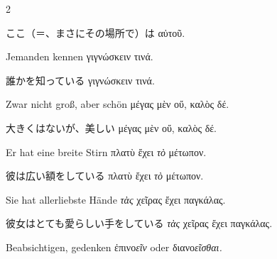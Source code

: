 \begin{paracol}{2}
\begin{enumerate}[leftmargin=0pt,rightmargin=0pt,listparindent =1cm,labelindent=1cm,labelsep=1ex,labelwidth={*},itemindent={*},align=left]
\begin{continuousitemline}
\begin{japanese}
ここ（＝、まさにその場所で）は \textgreek[variant=ancient]{αὐτοῦ.}
\end{japanese}
\switchcolumn*
\end{continuousitemline}

\begin{german}
\item Jemanden kennen \textgreek[variant=ancient]{γιγνώσκειν τινά.}
\end{german}
\switchcolumn

\begin{japanese}
誰かを知っている \textgreek[variant=ancient]{γιγνώσκειν τινά.}
\end{japanese}
\switchcolumn*

\begin{german}
\item Zwar nicht groß, aber schön \textgreek[variant=ancient]{μέγας μὲν
οὔ, καλὸς δέ.}
\end{german}
\switchcolumn

\begin{japanese}
大きくはないが、美しい \textgreek[variant=ancient]{μέγας μὲν
οὔ, καλὸς δέ.}
\end{japanese}
\switchcolumn*

\begin{german}
\item Er hat eine breite Stirn \textgreek[variant=ancient]{πλατὺ ἔχει \emph{τὸ}
μέτωπον.}
\end{german}
\switchcolumn

\begin{japanese}
彼は広い額をしている \textgreek[variant=ancient]{πλατὺ ἔχει \emph{τὸ}
μέτωπον.}
\end{japanese}
\switchcolumn*

\begin{german}
Sie hat allerliebste Hände \textgreek[variant=ancient]{\emph{τὰς}
χεῖρας ἔχει παγκάλας.}
\end{german}
\switchcolumn

\begin{japanese}
彼女はとても愛らしい手をしている \textgreek[variant=ancient]{\emph{τὰς}
χεῖρας ἔχει παγκάλας.}
\end{japanese}
\switchcolumn*

\begin{german}
\item Beabsichtigen, gedenken \textgreek[variant=ancient]{ἐπινο\emph{εῖν}}
oder \textgreek[variant=ancient]{διανο\emph{εῖσθαι.}}
\end{german}
\switchcolumn


\end{enumerate}
\end{paracol}
